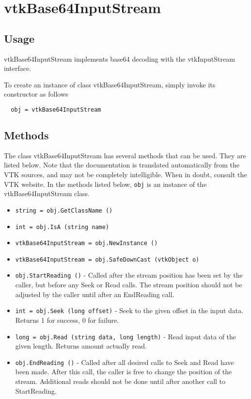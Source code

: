 \section{vtkBase64InputStream}

\subsection{Usage}

 vtkBase64InputStream implements base64 decoding with the
 vtkInputStream interface.

To create an instance of class vtkBase64InputStream, simply
invoke its constructor as follows
\begin{verbatim}
  obj = vtkBase64InputStream
\end{verbatim}
\subsection{Methods}

The class vtkBase64InputStream has several methods that can be used.
  They are listed below.
Note that the documentation is translated automatically from the VTK sources,
and may not be completely intelligible.  When in doubt, consult the VTK website.
In the methods listed below, \verb|obj| is an instance of the vtkBase64InputStream class.
\begin{itemize}
\item  \verb|string = obj.GetClassName ()|

\item  \verb|int = obj.IsA (string name)|

\item  \verb|vtkBase64InputStream = obj.NewInstance ()|

\item  \verb|vtkBase64InputStream = obj.SafeDownCast (vtkObject o)|

\item  \verb|obj.StartReading ()| -  Called after the stream position has been set by the caller, but
 before any Seek or Read calls.  The stream position should not be
 adjusted by the caller until after an EndReading call.

\item  \verb|int = obj.Seek (long offset)| -  Seek to the given offset in the input data.  Returns 1 for
 success, 0 for failure.

\item  \verb|long = obj.Read (string data, long length)| -  Read input data of the given length.  Returns amount actually
 read.

\item  \verb|obj.EndReading ()| -  Called after all desired calls to Seek and Read have been made.
 After this call, the caller is free to change the position of the
 stream.  Additional reads should not be done until after another
 call to StartReading.

\end{itemize}
